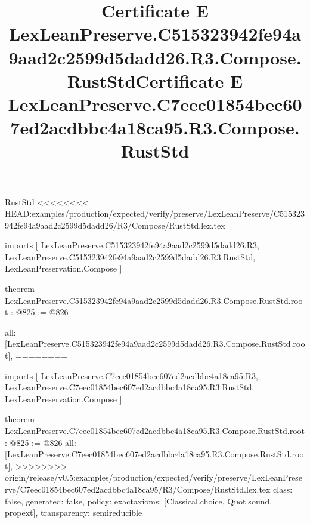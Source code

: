 \begin{lexlean}{RustStd}
<<<<<<<< HEAD:examples/production/expected/verify/preserve/LexLeanPreserve/C515323942fe94a9aad2c2599d5dadd26/R3/Compose/RustStd.lex.tex
\title{Certificate E LexLeanPreserve.C515323942fe94a9aad2c2599d5dadd26.R3.Compose.RustStd}
\begin{coremodule}
imports [
  LexLeanPreserve.C515323942fe94a9aad2c2599d5dadd26.R3,
  LexLeanPreserve.C515323942fe94a9aad2c2599d5dadd26.R3.RustStd,
  LexLeanPreservation.Compose
]

theorem LexLeanPreserve.C515323942fe94a9aad2c2599d5dadd26.R3.Compose.RustStd.root : @825 := @826 {
  all: [LexLeanPreserve.C515323942fe94a9aad2c2599d5dadd26.R3.Compose.RustStd.root],
========
\title{Certificate E LexLeanPreserve.C7eec01854bec607ed2acdbbc4a18ca95.R3.Compose.RustStd}
\begin{coremodule}
imports [
  LexLeanPreserve.C7eec01854bec607ed2acdbbc4a18ca95.R3,
  LexLeanPreserve.C7eec01854bec607ed2acdbbc4a18ca95.R3.RustStd,
  LexLeanPreservation.Compose
]

theorem LexLeanPreserve.C7eec01854bec607ed2acdbbc4a18ca95.R3.Compose.RustStd.root : @825 := @826 {
  all: [LexLeanPreserve.C7eec01854bec607ed2acdbbc4a18ca95.R3.Compose.RustStd.root],
>>>>>>>> origin/release/v0.5:examples/production/expected/verify/preserve/LexLeanPreserve/C7eec01854bec607ed2acdbbc4a18ca95/R3/Compose/RustStd.lex.tex
  class: false,
  generated: false,
  policy: exact{axioms: [Classical.choice, Quot.sound, propext]},
  transparency: semireducible
}


\end{coremodule}}
\end{coremodule}
\end{lexlean}
